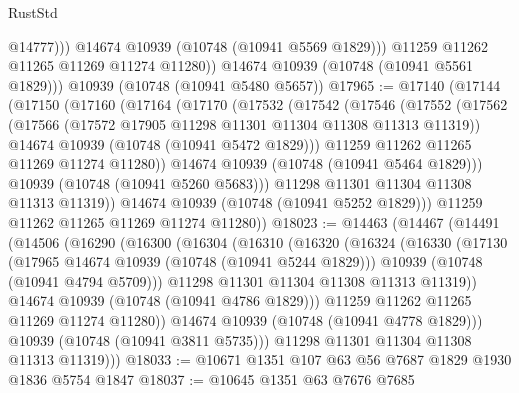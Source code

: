 \begin{lexlean}{RustStd}
\begin{coremodule}
{\begin{coremodule}
{{{{{                  @14777)))
            @14674
            @10939
            (@10748 (@10941 @5569 @1829)))
          @11259
          @11262
          @11265
          @11269
          @11274
          @11280))
      @14674
      @10939
      (@10748 (@10941 @5561 @1829)))
    @10939
    (@10748 (@10941 @5480 @5657))
@17965 := @17140
    (@17144
      (@17150
        (@17160
          (@17164
            (@17170
              (@17532
                (@17542
                  (@17546
                    (@17552
                      (@17562
                        (@17566 (@17572 @17905 @11298 @11301 @11304 @11308 @11313 @11319))
                        @14674
                        @10939
                        (@10748 (@10941 @5472 @1829)))
                      @11259
                      @11262
                      @11265
                      @11269
                      @11274
                      @11280))
                  @14674
                  @10939
                  (@10748 (@10941 @5464 @1829)))
                @10939
                (@10748 (@10941 @5260 @5683)))
              @11298
              @11301
              @11304
              @11308
              @11313
              @11319))
          @14674
          @10939
          (@10748 (@10941 @5252 @1829)))
        @11259
        @11262
        @11265
        @11269
        @11274
        @11280))
@18023 := @14463
    (@14467
      (@14491
        (@14506
          (@16290
            (@16300
              (@16304
                (@16310
                  (@16320
                    (@16324
                      (@16330
                        (@17130
                          (@17965 @14674 @10939 (@10748 (@10941 @5244 @1829)))
                          @10939
                          (@10748 (@10941 @4794 @5709)))
                        @11298
                        @11301
                        @11304
                        @11308
                        @11313
                        @11319))
                    @14674
                    @10939
                    (@10748 (@10941 @4786 @1829)))
                  @11259
                  @11262
                  @11265
                  @11269
                  @11274
                  @11280))
              @14674
              @10939
              (@10748 (@10941 @4778 @1829)))
            @10939
            (@10748 (@10941 @3811 @5735)))
          @11298
          @11301
          @11304
          @11308
          @11313
          @11319)))
@18033 := @10671 @1351 @107 @63 @56 @7687 @1829 @1930 @1836 @5754 @1847
@18037 := @10645 @1351 @63 @7676 @7685
}}}}}
\end{coremodule}}
\end{coremodule}
\end{lexlean}
